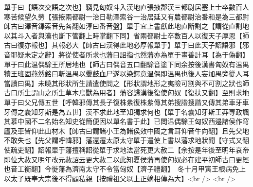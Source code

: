 單于曰【語次交語之次也】竊見匈奴斗入漢地直張掖郡漢三都尉居塞上士卒數百人寒苦候望久勞【張掖兩都尉一治日勒澤索谷一治居延又有農都尉治番和是為三都尉師古曰澤音鐸索音先各翻如淳曰番音盤】單于宜上書獻此地直斷割之【謂從直割地以其斗入者與漢也斷下管翻上時掌翻下同】省兩都尉士卒數百人以復天子厚恩【師古曰復亦報也】其報必大【師古曰漢得此地必厚報單于】單于曰此天子詔語邪【邪音耶疑未定之辭】將從使者所求也藩曰詔指也然藩亦為單于畫善計耳【為于偽翻】單于曰此温偶駼王所居地也【師古曰偶音五口翻駼音塗下同余按後漢書匈奴有温禺犢王班固燕然銘曰斬温禺以釁鼓血尸遂以染鍔意温偶即温禺也後人妄加禺旁從人耳當讀曰禺】未曉其形狀所生請遣使問之【形狀謂地形之夷險可割與不可割之狀也師古曰所生謂山之所生草木鳥獸為用者】藩容歸漢後復使匈奴【復扶又翻】至則求地單于曰父兄傳五世【呼韓邪傳其長子復株絫復株絫傳其弟搜諧搜諧又傳其弟車牙車牙傳之囊知牙斯是為五世】漢不求此地至知獨求何也【單于名囊知牙斯王莽專政諷其慕中國不二名始名知史從簡便因以單名書于此】已問温偶駼王匈奴西邉諸侯作穹廬及車皆仰此山材木【師古曰謂諸小王為諸侯效中國之言耳仰音牛向翻】且先父地不敢失也【先父謂呼韓邪】藩還遷太原太守單于遣使上書以藩求地狀聞【守式又翻使疏吏翻】詔報單于藩擅稱詔從單于求地法當死更大赦二【余按是年後至明年哀帝即位大赦又明年改元赦詔云更大赦二以此知夏侯藩再使匈奴必在建平初師古曰更經也音工衡翻】今徙藩為濟南太守不令當匈奴【濟子禮翻】　冬十月甲寅王根病免上以太子既奉大宗後不得顧私親【按禮祖父以上正嫡相傳為大】<br />
<br />

